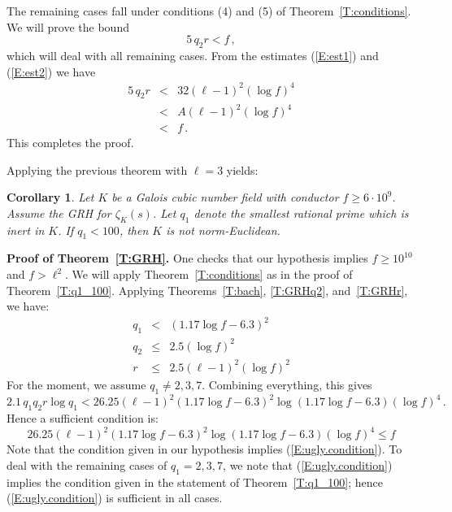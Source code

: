 \documentclass{amsart}
\newtheorem{corollary}[theorem]{Corollary}
\numberwithin{equation}{section}
\numberwithin{table}{section}
\begin{document}
The remaining cases fall under conditions (4) and (5) of Theorem~\ref{T:conditions}.
We will prove the bound
$$
  5\, q_2 r<f
  \,,
$$
which will deal with all remaining cases.
From the estimates (\ref{E:est1}) and (\ref{E:est2}) we have
\begin{eqnarray*}
  5\, q_2 r
  &<&
  32(\ell-1)^2(\log f)^4
  \\
  &<&
  A(\ell-1)^2(\log f)^4
  \\
  &<&
  f
  \,.
 \end{eqnarray*}
 This completes the proof.
 {\raisebox{-.25ex}{\scalebox{.786}[1.272]{$\blacksquare$}}}

\vspace{1ex}

Applying the previous theorem with $\ell=3$ yields:
\begin{corollary}\label{C:myspecial}
 Let $K$ be a Galois cubic number field with conductor $f\geq 6\cdot 10^{9}$.
 Assume the GRH for $\zeta_K(s)$.
   Let $q_1$ denote the smallest rational prime which is inert in $K$.
  If $q_1<100$, then $K$ is not norm-Euclidean.
\end{corollary}

\noindent\textbf{Proof of Theorem~\ref{T:GRH}.}
One checks that our hypothesis implies
$f\geq 10^{10}$ and $f>\ell^2$.
We will apply Theorem~\ref{T:conditions} as in the proof
of Theorem~\ref{T:q1_100}.
Applying Theorems~\ref{T:bach}, \ref{T:GRHq2}, and~\ref{T:GRHr}, we have:
\begin{eqnarray}
  \nonumber
  q_1&<&(1.17\log f-6.3)^2\\
  \label{E:newq2}
  q_2&\leq&2.5(\log f)^2\\
  \label{E:newr}
  r&\leq&2.5(\ell-1)^2(\log f)^2
\end{eqnarray}
For the moment, we assume $q_1\neq 2,3,7$.
Combining everything, this gives
$$
  2.1\,q_1 q_2 r\log q_1<
  26.25(\ell-1)^2(1.17\log f-6.3)^2\log(1.17\log f-6.3)(\log f)^4
  \,.
$$
Hence a sufficient condition is:
\begin{equation}\label{E:ugly.condition}
  26.25(\ell-1)^2(1.17\log f-6.3)^2\log(1.17\log f-6.3)(\log f)^4\leq f
\end{equation}
Note that the condition given in our hypothesis implies (\ref{E:ugly.condition}).
To deal with the remaining cases of $q_1=2,3,7$, we note that 
(\ref{E:ugly.condition}) implies the condition given in the statement of
Theorem~\ref{T:q1_100}; hence (\ref{E:ugly.condition})
is sufficient in all cases.
{\raisebox{-.25ex}{\scalebox{.786}[1.272]{$\blacksquare$}}}
\end{document}
